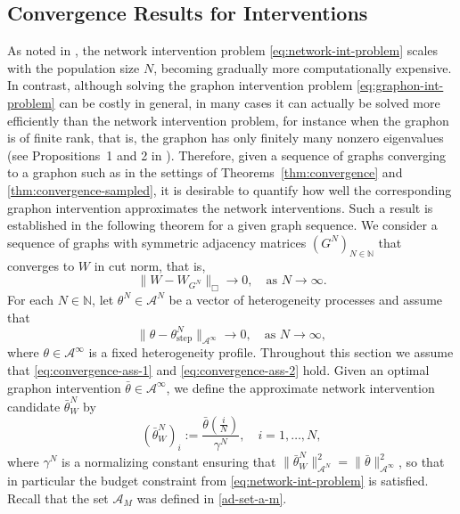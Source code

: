 \documentclass[11pt]{article}
\newcommand{\N}{{\mathbb N}}
\newcommand{\be}{\begin{equation}}
\newcommand{\ee}{\end{equation}}
\numberwithin{equation}{section}
\begin{document}
\subsection{Convergence Results for Interventions}\label{subsec:int-convergence}
As noted in \cite{parise2023graphon}, the network intervention problem \eqref{eq:network-int-problem} scales with the population size $N$, becoming gradually more computationally expensive. In contrast, although solving the graphon intervention problem \eqref{eq:graphon-int-problem} can be costly in general, in many cases it can actually be solved more efficiently than the network intervention problem, for instance when the graphon is of finite rank, that is, the graphon has only finitely many nonzero eigenvalues (see Propositions~1 and 2 in \cite{parise2023graphon}).  Therefore, given a sequence of graphs converging to a graphon such as in the settings of Theorems~\ref{thm:convergence} and \ref{thm:convergence-sampled}, it is desirable to quantify how well the corresponding graphon intervention approximates the network interventions. Such a result is established in the following theorem for a given graph sequence. We consider a sequence of graphs with symmetric adjacency matrices $(G^N)_{N\in\N}$ that converges to $W$ in cut norm, that is, 
\be \label{eq:convergence-ass-1}  
\|W-W_{G^N}\|_\Box\to 0,\quad \textrm{as }N\to\infty.
\ee 
For each $N\in\N$, let ${\theta}^N\in \mathcal{A}^N$ be a vector of heterogeneity processes and assume that 
\be \label{eq:convergence-ass-2}  
\|\theta-\theta^N_{\operatorname{step}}\|_{\mathcal{A}^\infty}\to 0,\quad \textrm{as }N\to\infty,
\ee
where $\theta\in\mathcal{A}^\infty$ is a fixed heterogeneity profile. 
Throughout this section we assume that \eqref{eq:convergence-ass-1}  and \eqref{eq:convergence-ass-2}  hold. 
Given an optimal graphon intervention $\bar\theta\in\mathcal{A}^\infty$, we define the approximate network intervention candidate $\bar\theta^N_W$ by
\be\label{eq:approx-intervention}
(\bar\theta^N_W)_i:=\frac{\bar\theta (\frac{i}{N})}{\gamma^N},\quad i=1,\ldots, N,
\ee
where $\gamma^N$ is a normalizing constant ensuring that $\|\bar\theta^N_W\|_{\mathcal{A}^N}^2=\|\bar\theta\|_{\mathcal{A^\infty}}^2$, so that in particular the budget constraint from \eqref{eq:network-int-problem} is satisfied. Recall that the set $\mathcal A_{M}$ was defined in \eqref{ad-set-a-m}. 
\end{document}
